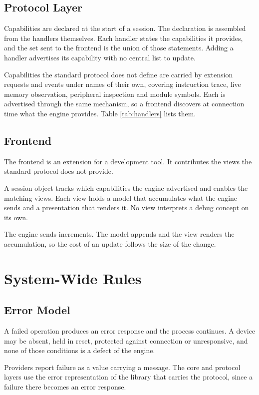 \subsection{Protocol Layer}
Capabilities are declared at the start of a session. The declaration is assembled from the handlers themselves. Each handler states the capabilities it provides, and the set sent to the frontend is the union of those statements. Adding a handler advertises its capability with no central list to update.

Capabilities the standard protocol does not define are carried by extension requests and events under names of their own, covering instruction trace, live memory observation, peripheral inspection and module symbols. Each is advertised through the same mechanism, so a frontend discovers at connection time what the engine provides. Table \ref{tab:handlers} lists them.

\subsection{Frontend}
The frontend is an extension for a development tool. It contributes the views the standard protocol does not provide.

A session object tracks which capabilities the engine advertised and enables the matching views. Each view holds a model that accumulates what the engine sends and a presentation that renders it. No view interprets a debug concept on its own.

The engine sends increments. The model appends and the view renders the accumulation, so the cost of an update follows the size of the change.

\section{System-Wide Rules}
\label{sec:design_rules}

\subsection{Error Model}
A failed operation produces an error response and the process continues. A device may be absent, held in reset, protected against connection or unresponsive, and none of those conditions is a defect of the engine.

Providers report failure as a value carrying a message. The core and protocol layers use the error representation of the library that carries the protocol, since a failure there becomes an error response.

